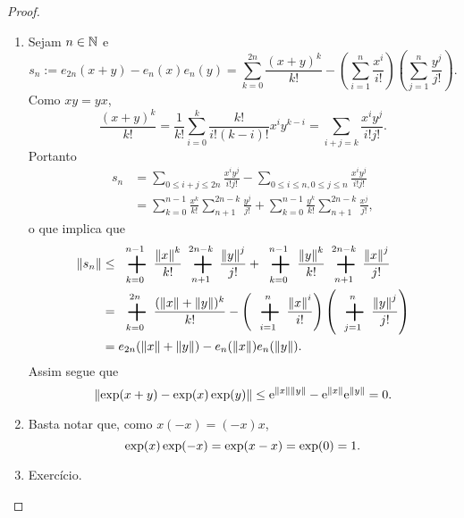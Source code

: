 \begin{proof}
\begin{enumerate}
	\item Sejam $n \in \mathbb{N}$ e
		\begin{equation*}
		s_n := e_{2n}(x+y) - e_n(x)e_n(y) = \sum_{k=0}^{2n} \frac{(x+y)^k}{k!} - \left( \sum_{i=1}^n \frac{x^i}{i!} \right)\left( \sum_{j=1}^n \frac{y^j}{j!} \right).
		\end{equation*}
Como $xy=yx$,
	\begin{equation*}
	\frac{(x+y)^k}{k!} = \frac{1}{k!} \sum_{i=0}^k \frac{k!}{i!(k-i)!}x^i y^{k-i} = \sum_{i+j=k} \frac{x^i y^j}{i!j!}.
	\end{equation*}
Portanto
	\begin{align*}
	s_n &= \sum_{0 \leq i+j \leq 2n} \frac{x^i y^j}{i!j!} - \sum_{0 \leq i \leq n, 0 \leq j \leq n} \frac{x^i y^j}{i!j!} \\
		&= \sum_{k=0}^{n-1} \frac{x^k}{k!} \sum_{n+1}^{2n-k} \frac{y^j}{j!} +  \sum_{k=0}^{n-1} \frac{y^k}{k!} \sum_{n+1}^{2n-k} \frac{x^j}{j!},
	\end{align*}
o que implica que
	\begin{align*}
	\nor{s_n} &\leq \sum_{k=0}^{n-1} \frac{\nor{x}^k}{k!} \sum_{n+1}^{2n-k} \frac{\nor{y}^j}{j!} +  \sum_{k=0}^{n-1} \frac{\nor{y}^k}{k!} \sum_{n+1}^{2n-k} \frac{\nor{x}^j}{j!} \\
		&= \sum_{k=0}^{2n} \frac{(\nor{x}+\nor{y})^k}{k!} - \left( \sum_{i=1}^n \frac{\nor{x}^i}{i!} \right)\left( \sum_{j=1}^n \frac{\nor{y}^j}{j!} \right) \\
		&= e_{2n}(\nor{x}+\nor{y}) - e_n(\nor{x})e_n(\nor{y}).
	\end{align*}
Assim segue que
	\begin{equation*}
	\left\Vert{\exp(x+y) - \exp(x)\exp(y)}\right\Vert \leq \mathrm{e}^{\left\Vert{x}\right\Vert\left\Vert{y}\right\Vert}-\mathrm{e}^{\left\Vert{x}\right\Vert}\mathrm{e}^{\left\Vert{y}\right\Vert} = 0.
	\end{equation*}
	
\begin{comment}
	\item Para todo $n \in \N$, como $xy=yx$,
	\begin{equation*}
	(x+y)^n = \sum_{i=0}^n \frac{n!}{i!(n-i)!}x^i y^{n-i} = n! \sum_{i+j=n} \frac{x^i}{i!}\frac{y^j}{j!}.
	\end{equation*}
Portanto
	\begin{align*}
	\exp(x+y) &= \sum_{n=0}^\infty \frac{(x+y)^n}{n!} \\
		&= \sum_{n=0}^\infty \sum_{i+j=n} \frac{x^i y^j}{i!j!} \\
		&= \left(\sum_{i=0}^\infty \frac{x^i}{i!} \right) \left(\sum_{i=0}^\infty \frac{y^j}{j!} \right) \\
		&= \exp(x) \exp(y).
	\end{align*}
\end{comment}
	
	\item Basta notar que, como $x(-x)=(-x)x$,
		\begin{equation*}
		\exp(x)\exp(-x) = \exp(x-x) = \exp(0) = 1. \qedhere
		\end{equation*}
	
	\item Exercício.
	\end{enumerate}
\end{proof}